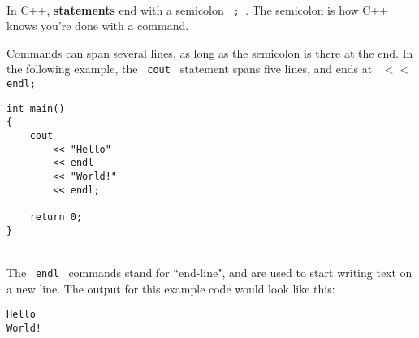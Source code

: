 \documentclass[a4paper,12pt]{book}
\begin{document}
                ~\\
                In C++, \textbf{ statements } end with a semicolon \texttt{ ; }.
                The semicolon is how C++ knows you're done with a command.

                \newpage
                Commands can span several lines, as long as the semicolon
                is there at the end. In the following example, the \texttt{ cout }
                statement spans five lines, and ends at \texttt{ $<<$ endl; } \\

\begin{lstlisting}[style=code]
int main()
{
    cout
        << "Hello"
        << endl
        << "World!"
        << endl;
        
    return 0;
}
\end{lstlisting}

                ~\\
                The \texttt{ endl } commands stand for ``end-line",
                and are used to start writing text on a new line.
                The output for this example code would look like this:

\begin{lstlisting}[style=output]
Hello
World!
\end{lstlisting}
            
            
\end{document}
